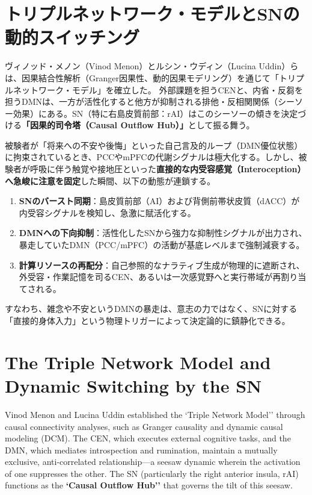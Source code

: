 \ifja
    \section{トリプルネットワーク・モデルとSNの動的スイッチング}

    ヴィノッド・メノン（Vinod Menon）とルシン・ウディン（Lucina Uddin）らは、因果結合性解析（Granger因果性、動的因果モデリング）を通じて「トリプルネットワーク・モデル」を確立した。
    外部課題を担うCENと、内省・反芻を担うDMNは、一方が活性化すると他方が抑制される排他・反相関関係（シーソー効果）にある。SN（特に右島皮質前部：rAI）はこのシーソーの傾きを決定づける\textbf{「因果的司令塔（Causal Outflow Hub）」}として振る舞う。

    

    被験者が「将来への不安や後悔」といった自己言及的ループ（DMN優位状態）に拘束されているとき、PCCやmPFCの代謝シグナルは極大化する。しかし、被験者が呼吸に伴う触覚や接地圧といった\textbf{直接的な内受容感覚（Interoception）へ急峻に注意を固定}した瞬間、以下の動態が連鎖する。

    \begin{enumerate}[label=(\arabic*)]
        \item \textbf{SNのバースト同期}：島皮質前部（AI）および背側前帯状皮質（dACC）が内受容シグナルを検知し、急激に賦活化する。
        \item \textbf{DMNへの下向抑制}：活性化したSNから強力な抑制性シグナルが出力され、暴走していたDMN（PCC/mPFC）の活動が基底レベルまで強制減衰する。
        \item \textbf{計算リソースの再配分}：自己参照的なナラティブ生成が物理的に遮断され、外受容・作業記憶を司るCEN、あるいは一次感覚野へと実行帯域が再割り当てされる。
    \end{enumerate}

    すなわち、雑念や不安というDMNの暴走は、意志の力ではなく、SNに対する「直接的身体入力」という物理トリガーによって決定論的に鎮静化できる。
\else
    \section{The Triple Network Model and Dynamic Switching by the SN}

    Vinod Menon and Lucina Uddin established the `Triple Network Model'' through causal connectivity analyses, such as Granger causality and dynamic causal modeling (DCM). The CEN, which executes external cognitive tasks, and the DMN, which mediates introspection and rumination, maintain a mutually exclusive, anti-correlated relationship—a seesaw dynamic wherein the activation of one suppresses the other. The SN (particularly the right anterior insula, rAI) functions as the \textbf{`Causal Outflow Hub''} that governs the tilt of this seesaw.

